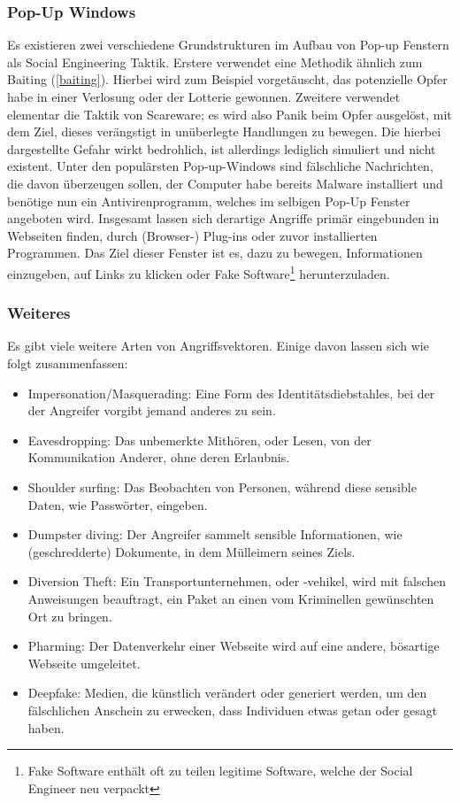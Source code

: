 \subsubsection{Pop-Up Windows}
Es existieren zwei verschiedene Grundstrukturen im Aufbau von Pop-up Fenstern als Social Engineering Taktik. Erstere verwendet eine Methodik ähnlich zum Baiting (\autoref{baiting}).
Hierbei wird zum Beispiel vorgetäuscht, das potenzielle Opfer habe in einer Verlosung oder der Lotterie gewonnen.
Zweitere verwendet elementar die Taktik von Scareware; es wird also Panik beim Opfer ausgelöst, mit dem Ziel, dieses verängstigt in unüberlegte Handlungen zu bewegen. Die hierbei
dargestellte Gefahr wirkt bedrohlich, ist allerdings lediglich simuliert und nicht existent. Unter den populärsten Pop-up-Windows sind fälschliche Nachrichten, die davon
überzeugen sollen, der Computer habe bereits Malware installiert und benötige nun ein Antivirenprogramm, welches im selbigen Pop-Up Fenster angeboten wird.
Insgesamt lassen sich derartige Angriffe primär eingebunden in Webseiten finden, durch (Browser-) Plug-ins oder
zuvor installierten Programmen. Das Ziel dieser Fenster ist es, dazu zu bewegen, Informationen einzugeben, auf Links zu klicken oder Fake Software\footnote{Fake Software enthält oft zu teilen legitime Software, welche der Social Engineer neu verpackt} herunterzuladen.

\subsubsection{Weiteres}
Es gibt viele weitere Arten von Angriffsvektoren. Einige davon lassen sich wie folgt zusammenfassen:

\begin{itemize}
    \setlength\itemsep{-1em}
    \item Impersonation/Masquerading: Eine Form des Identitätsdiebstahles, bei der der Angreifer vorgibt jemand anderes zu sein.
    \item Eavesdropping: Das unbemerkte Mithören, oder Lesen, von der Kommunikation Anderer, ohne deren Erlaubnis.
    \item Shoulder surfing: Das Beobachten von Personen, während diese sensible Daten, wie Passwörter, eingeben.
    \item Dumpster diving: Der Angreifer sammelt sensible Informationen, wie (geschredderte) Dokumente, in dem Mülleimern seines Ziels.
    \item Diversion Theft: Ein Transportunternehmen, oder -vehikel, wird mit falschen Anweisungen beauftragt, ein Paket an einen vom Kriminellen gewünschten Ort zu bringen.
    \item Pharming: Der Datenverkehr einer Webseite wird auf eine andere, bösartige Webseite umgeleitet.
    \item Deepfake: Medien, die künstlich verändert oder generiert werden, um den fälschlichen Anschein zu erwecken, dass Individuen etwas getan oder gesagt haben.
\end{itemize}

